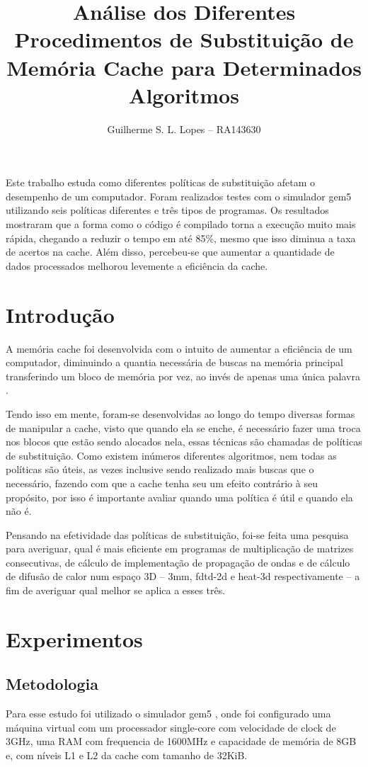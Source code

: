 \documentclass[12pt]{article}
\title{Análise dos Diferentes Procedimentos de Substituição de Memória Cache 
para Determinados Algoritmos}
\author{Guilherme S. L. Lopes -- RA143630}
\begin{document}
\maketitle

\begin{resumo}
Este trabalho estuda como diferentes políticas de substituição afetam o 
desempenho de um computador. Foram realizados testes com o simulador gem5 
utilizando seis políticas diferentes e três tipos de programas. Os resultados 
mostraram que a forma como o código é compilado torna a execução muito mais 
rápida, chegando a reduzir o tempo em até 85\%, mesmo que isso diminua a taxa 
de acertos na cache. Além disso, percebeu-se que aumentar a quantidade de dados 
processados melhorou levemente a eficiência da cache.
\end{resumo}

\section{Introdução}
A memória cache foi desenvolvida com o intuito de aumentar a eficiência de um 
computador, diminuindo a quantia necessária de buscas na memória principal 
transferindo um bloco de memória por vez, ao invés de apenas uma única palavra
\cite{stallings2017arquitetura}.

Tendo isso em mente, foram-se desenvolvidas ao longo do tempo diversas formas de 
manipular a cache, visto que quando ela se enche, é necessário fazer uma troca 
nos blocos que estão sendo alocados nela, essas técnicas são chamadas de 
políticas de substituição. Como existem inúmeros diferentes algoritmos, nem 
todas as políticas são úteis, as vezes inclusive sendo realizado mais buscas 
que o necessário, fazendo com que a cache tenha seu um efeito contrário à seu 
propósito, por isso é importante avaliar quando uma política é útil e quando 
ela não é.

Pensando na efetividade das políticas de substituição, foi-se feita uma pesquisa 
para averiguar, qual é mais eficiente em programas de multiplicação de matrizes 
consecutivas, de cálculo de implementação de propagação de ondas e de cálculo 
de difusão de calor num espaço 3D -- 3mm, fdtd-2d e heat-3d respectivamente 
\cite{polybench} -- a fim de averiguar qual melhor se aplica a esses três.

\section{Experimentos}
    \subsection{Metodologia}
    Para esse estudo foi utilizado o simulador gem5 \cite{Binkert:2011:gem5}, 
    onde foi configurado uma máquina virtual com um processador single-core 
    com velocidade de clock de 3GHz, uma RAM com frequencia de 1600MHz e 
    capacidade de memória de 8GB e, com níveis L1 e L2 da cache com tamanho de 
    32KiB. 
\end{document}
